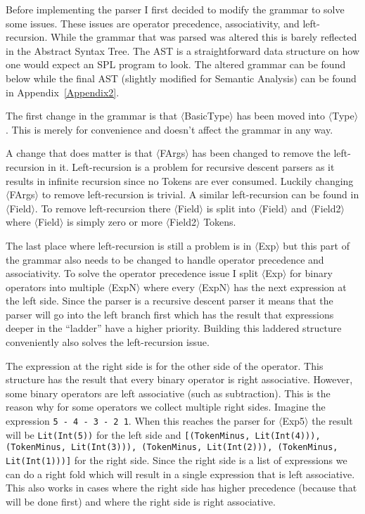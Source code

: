 \documentclass{article}
\begin{document}
Before implementing the parser I first decided to modify the grammar to solve some issues. These issues are operator precedence, associativity, and left-recursion. While the grammar that was parsed was altered this is barely reflected in the Abstract Syntax Tree. The AST is a straightforward data structure on how one would expect an SPL program to look. The altered grammar can be found below while the final AST (slightly modified for Semantic Analysis) can be found in Appendix~\ref{Appendix2}.

The first change in the grammar is that $\langle$BasicType$\rangle$ has been moved into $\langle$Type$\rangle$. This is merely for convenience and doesn't affect the grammar in any way.

A change that does matter is that $\langle$FArgs$\rangle$ has been changed to remove the left-recursion in it. Left-recursion is a problem for recursive descent parsers as it results in infinite recursion since no Tokens are ever consumed. Luckily changing $\langle$FArgs$\rangle$ to remove left-recursion is trivial. A similar left-recursion can be found in $\langle$Field$\rangle$. To remove left-recursion there $\langle$Field$\rangle$ is split into $\langle$Field$\rangle$ and $\langle$Field2$\rangle$ where $\langle$Field$\rangle$ is simply zero or more $\langle$Field2$\rangle$ Tokens.

The last place where left-recursion is still a problem is in $\langle$Exp$\rangle$ but this part of the grammar also needs to be changed to handle operator precedence and associativity. To solve the operator precedence issue I split $\langle$Exp$\rangle$ for binary operators into multiple $\langle$ExpN$\rangle$ where every $\langle$ExpN$\rangle$ has the next expression at the left side. Since the parser is a recursive descent parser it means that the parser will go into the left branch first which has the result that expressions deeper in the ``ladder'' have a higher priority. Building this laddered structure conveniently also solves the left-recursion issue.

The expression at the right side is for the other side of the operator. This structure has the result that every binary operator is right associative. However, some binary operators are left associative (such as subtraction). This is the reason why for some operators we collect multiple right sides. Imagine the expression \texttt{5 - 4 - 3 - 2 1}. When this reaches the parser for $\langle$Exp5$\rangle$ the result will be \texttt{Lit(Int(5))} for the left side and \texttt{[(TokenMinus, Lit(Int(4))), (TokenMinus, Lit(Int(3))), (TokenMinus, Lit(Int(2))), (TokenMinus, Lit(Int(1)))]} for the right side. Since the right side is a list of expressions we can do a right fold which will result in a single expression that is left associative. This also works in cases where the right side has higher precedence (because that will be done first) and where the right side is right associative.
\end{document}
